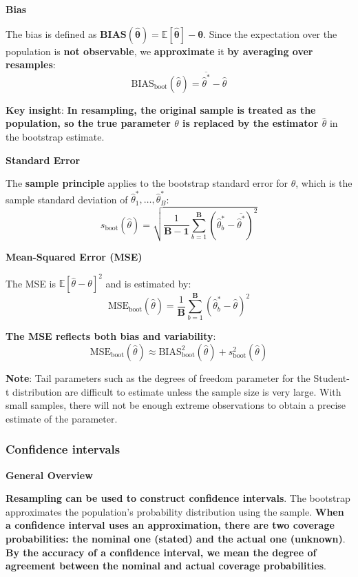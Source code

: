\documentclass[12pt,a4paper]{article}
\begin{document}
\vspace{0.5em}

\textbf{Bias}

The bias is defined as $\mathbf{\text{BIAS}(\hat{\theta}) = \mathbb{E}[\hat{\theta}] - \theta}$. Since the expectation over the population is \textbf{not observable}, we \textbf{approximate} it \textbf{by averaging over resamples}:
\[
\text{BIAS}_{\text{boot}}(\hat{\theta}) = \overline{\hat{\theta}^*} - \hat{\theta}
\]

\textbf{Key insight}: \textbf{In resampling, the original sample is treated as the population, so the true parameter $\theta$ is replaced by the estimator $\hat{\theta}$} in the bootstrap estimate.

\vspace{0.5em}

\textbf{Standard Error}

The \textbf{sample principle} applies to the bootstrap standard error for $\hat{\theta}$, which is the sample standard deviation of $\hat{\theta}_1^*, \ldots, \hat{\theta}_B^*$:
\[
s_{\text{boot}}(\hat{\theta}) = \sqrt{\frac{1}{\mathbf{B-1}} \sum_{b=1}^{\mathbf{B}} (\hat{\theta}_b^* - \overline{\hat{\theta}^*})^2}
\]

\vspace{0.5em}

\textbf{Mean-Squared Error (MSE)}

The MSE is $\mathbb{E}[\hat{\theta} - \theta]^2$ and is estimated by:
\[
\text{MSE}_{\text{boot}}(\hat{\theta}) = \frac{1}{\mathbf{B}} \sum_{b=1}^{\mathbf{B}} (\hat{\theta}_b^* - \hat{\theta})^2
\]

\textbf{The MSE reflects both bias and variability}:
\[
\text{MSE}_{\text{boot}}(\hat{\theta}) \approx \text{BIAS}_{\text{boot}}^2(\hat{\theta}) + s_{\text{boot}}^2(\hat{\theta})
\]

\textbf{Note}: Tail parameters such as the degrees of freedom parameter for the Student-t distribution are
difficult to estimate unless the sample size is very large. With small samples, there will not be
enough extreme observations to obtain a precise estimate of the parameter.

\subsubsection{Confidence intervals}

\textbf{General Overview}

\textbf{Resampling can be used to construct confidence intervals}. The bootstrap approximates the population's probability distribution using the sample. \textbf{When a confidence interval uses an approximation, there are two coverage probabilities: the nominal one (stated) and the actual one (unknown)}. \textbf{By the accuracy of a confidence interval, we mean the degree of agreement between the nominal and actual coverage probabilities}.
\end{document}
